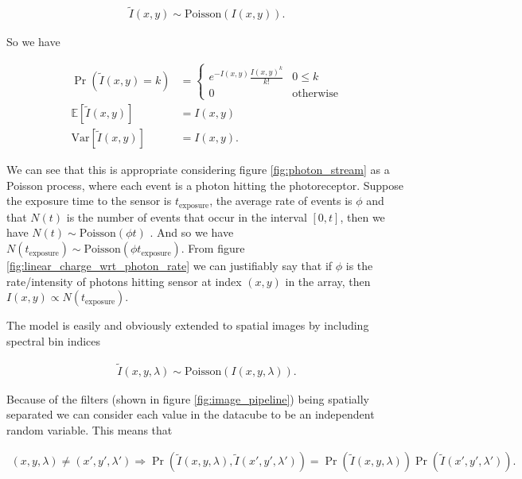 \documentclass[12pt,twoside,notitlepage]{report}
\newcommand{\var}{\text{Var}}
\newcommand{\bb}[1]{\mathbb{#1}}
\begin{document}
            \begin{align}
                \tilde{I}(x,y) \sim \text{Poisson}(I(x,y)).
            \end{align}

            So we have

            \begin{align}
                \Pr(\tilde{I}(x,y) = k) & = 
                    \begin{cases}
                        e^{-I(x,y)} \frac{I(x,y)^k}{k!} & 0 \leq k              \label{eq:image_poisson} \\
                        0 & \text{otherwise}
                    \end{cases} \\
                \bb{E}\left[ \tilde{I}(x,y) \right] & = I(x,y) \\
                \var\left[ \tilde{I}(x,y) \right] & = I(x,y).                 
            \end{align}

            We can see that this is appropriate considering figure \ref{fig:photon_stream} as a Poisson process, where 
            each event is a photon hitting the photoreceptor. Suppose the exposure time to the sensor is 
            $t_{\text{exposure}}$, the average rate of events is $\phi$ and that $N(t)$ is the number of events that 
            occur in the interval $[0,t]$, then we have $N(t) \sim \text{Poisson}(\phi t)$ \cite{ross2002probability}. 
            And so we have $N(t_{\text{exposure}}) \sim \text{Poisson}(\phi t_{\text{exposure}})$. From figure 
            \ref{fig:linear_charge_wrt_photon_rate} we can justifiably say that if $\phi$ is the rate/intensity of 
            photons hitting sensor at index $(x,y)$ in the array, then $I(x,y) \propto N(t_{\text{exposure}})$.
            
            The model is easily and obviously extended to spatial images by including spectral bin indices 

            \begin{align}
                \tilde{I}(x,y,\lambda) \sim \text{Poisson}(I(x,y,\lambda)).
            \end{align}

            Because of the filters (shown in figure \ref{fig:image_pipeline}) being spatially separated we can consider 
            each value in the datacube to be an independent random variable. This means that 

            \begin{align}
                (x,y,\lambda) \neq (x',y',\lambda') \Rightarrow 
                      \Pr(\tilde{I}(x,y,\lambda), \tilde{I}(x',y',\lambda')) = \Pr(\tilde{I}(x,y,\lambda)) \Pr(\tilde{I}(x',y',\lambda')).
            \end{align}
\end{document}
